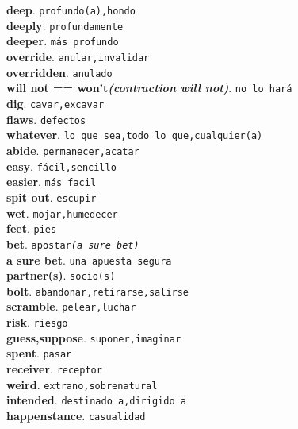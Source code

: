 \documentclass[twocolumn]{article}
\begin{document}
	\textsf{\textbf{deep}}. \texttt{profundo(a),hondo}\\
	\textsf{\textbf{deeply}}. \texttt{profundamente}\\
	\textsf{\textbf{deeper}}. \texttt{m\'as profundo}\\
	\textsf{\textbf{override}}. \texttt{anular,invalidar}\\
	\textsf{\textbf{overridden}}. \texttt{anulado}\\
	\textsf{\textbf{will not == won't{\scriptsize \textsl{(contraction will not)}}}}. \texttt{no lo har\'a}\\
	\textsf{\textbf{dig}}. \texttt{cavar,excavar}\\
	\textsf{\textbf{flaws}}. \texttt{defectos}\\
	\textsf{\textbf{whatever}}. \texttt{lo que sea,todo lo que,cualquier(a)}\\
	\textsf{\textbf{abide}}. \texttt{permanecer,acatar}\\
	\textsf{\textbf{easy}}. \texttt{f\'acil,sencillo}\\
	\textsf{\textbf{easier}}. \texttt{m\'as facil}\\
	\textsf{\textbf{spit out}}. \texttt{escupir}\\
	\textsf{\textbf{wet}}. \texttt{mojar,humedecer}\\
	\textsf{\textbf{feet}}. \texttt{pies}\\
	\textsf{\textbf{bet}}. \texttt{apostar{\scriptsize \textsl{(a sure bet)}}}\\
	\textsf{\textbf{a sure bet}}. \texttt{una apuesta segura}\\
	\textsf{\textbf{partner(s)}}. \texttt{socio(s)}\\
	\textsf{\textbf{bolt}}. \texttt{abandonar,retirarse,salirse}\\
	\textsf{\textbf{scramble}}. \texttt{pelear,luchar}\\
	\textsf{\textbf{risk}}. \texttt{riesgo}\\
	\textsf{\textbf{guess,suppose}}. \texttt{suponer,imaginar}\\
	\textsf{\textbf{spent}}. \texttt{pasar}\\
	\textsf{\textbf{receiver}}. \texttt{receptor}\\
	\textsf{\textbf{weird}}. \texttt{extrano,sobrenatural}\\
	\textsf{\textbf{intended}}. \texttt{destinado a,dirigido a}\\
	\textsf{\textbf{happenstance}}. \texttt{casualidad}\\
\end{document}
